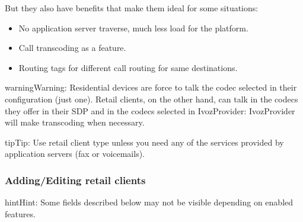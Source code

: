 \documentclass[letterpaper,10pt,english]{sphinxmanual}
\begin{document}
But they also have benefits that make them ideal for some situations:
\begin{itemize}
\item {} 
No application server traverse, much less load for the platform.

\item {} 
Call transcoding as a feature.

\item {} 
Routing tags for different call routing for same destinations.

\end{itemize}

\begin{notice}{warning}{Warning:}
Residential devices are force to talk the codec selected in their configuration (just one).
Retail clients, on the other hand, can talk in the codecs they offer in their SDP and in the
codecs selected in IvozProvider: IvozProvider will make transcoding when necessary.
\end{notice}

\begin{notice}{tip}{Tip:}
Use retail client type unless you need any of the services provided by application servers (fax or voicemails).
\end{notice}


\subsubsection{Adding/Editing retail clients}
\label{administration_portal/brand/clients/retail:adding-editing-retail-clients}
\begin{notice}{hint}{Hint:}
Some fields described below may not be visible depending on enabled features.
\end{notice}
\end{document}
